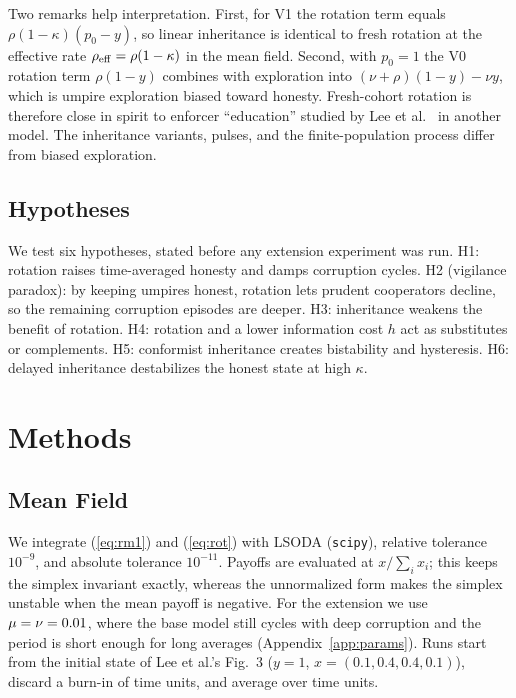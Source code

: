 \documentclass[journal]{IEEEtran}
\begin{document}
Two remarks help interpretation. First, for V1 the rotation term equals $\rho(1-\kappa)(p_0-y)$,
so linear inheritance is identical to fresh rotation at the effective rate
$\rho_{\rm eff}=\rho(1-\kappa)$ in the mean field. Second, with $p_0=1$ the V0 rotation term
$\rho(1-y)$ combines with exploration into $(\nu+\rho)(1-y)-\nu y$, which is umpire exploration
biased toward honesty. Fresh-cohort rotation is therefore close in spirit to enforcer
``education'' studied by Lee et al.~\cite{lee2015logging} in another model. The inheritance
variants, pulses, and the finite-population process differ from biased exploration.

\subsection{Hypotheses}
We test six hypotheses, stated before any extension experiment was run.
H1: rotation raises time-averaged honesty and damps corruption cycles.
H2 (vigilance paradox): by keeping umpires honest, rotation lets prudent cooperators decline, so
the remaining corruption episodes are deeper.
H3: inheritance weakens the benefit of rotation.
H4: rotation and a lower information cost $h$ act as substitutes or complements.
H5: conformist inheritance creates bistability and hysteresis.
H6: delayed inheritance destabilizes the honest state at high $\kappa$.

\section{Methods}\label{sec:methods}

\subsection{Mean Field}
We integrate (\ref{eq:rm1}) and (\ref{eq:rot}) with LSODA (\texttt{scipy}), relative tolerance
$10^{-9}$, and absolute tolerance $10^{-11}$. Payoffs are evaluated at $x/\sum_i x_i$; this keeps
the simplex invariant exactly, whereas the unnormalized form makes the simplex unstable when the
mean payoff is negative. For the extension we use $\mu=\nu=0.01$, where the base model still
cycles with deep corruption and the period is short enough for long averages
(Appendix~\ref{app:params}). Runs start from the initial state of Lee et al.'s Fig.~3 ($y=1$,
$x=(0.1,0.4,0.4,0.1)$), discard a burn-in of \TBurnMF{} time units, and average over \TWinMF{}
time units.
\end{document}
